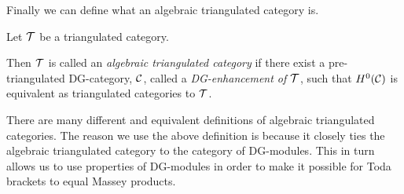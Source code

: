 Finally we can define what an algebraic triangulated category is.
\begin{definition}
    \label{def:alg_tri_cat}
    Let \( {\mathcal{T}} \) be a triangulated category.

    Then \( {\mathcal{T}} \) is called an \emph{algebraic triangulated category} if there exist a pre-triangulated DG-category, \( {\mathcal{C}} \), called a \emph{DG-enhancement of \( {\mathcal{T}} \)}, such that \( H^0({\mathcal{C}}) \) is equivalent as triangulated categories to \( {\mathcal{T}} \).
\end{definition}

There are many different and equivalent definitions of algebraic triangulated categories. The reason we use the above definition is because it closely ties the algebraic triangulated category to the category of DG-modules. This in turn allows us to use properties of DG-modules in order to make it possible for Toda brackets to equal Massey products.

